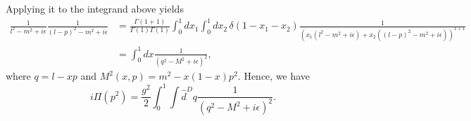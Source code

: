 \documentclass{article}
\numberwithin{equation}{section}
\begin{document}
Applying it to the integrand above yields 
\begin{equation}
\begin{aligned}
    \frac{1}{l^2 - m^2 + i\epsilon} \frac{1}{(l - p)^2 - m^2 + i\epsilon} &= \frac{\Gamma(1+1)}{\Gamma(1) \Gamma(1)} \int_0^1 dx_1 \int_0^1 dx_2\, \delta(1-x_1-x_2) \frac{1}{(x_1(l^2-m^2+i\epsilon) + x_2((l-p)^2 - m^2 + i\epsilon))^{1+1}} \\
    &= \int_0^1 dx \frac{1}{(q^2 - M^2 + i\epsilon)^2},
\end{aligned}
\end{equation}
where $q = l - xp$ and $M^2(x, p) = m^2 - x(1-x)p^2$. Hence, we have 
\begin{equation}
    i\Pi(p^2) = \frac{g^2}{2} \int_0^1 \int \hat{d}^Dq \frac{1}{(q^2 - M^2 + i\epsilon)^2}.
\end{equation}
\end{document}
